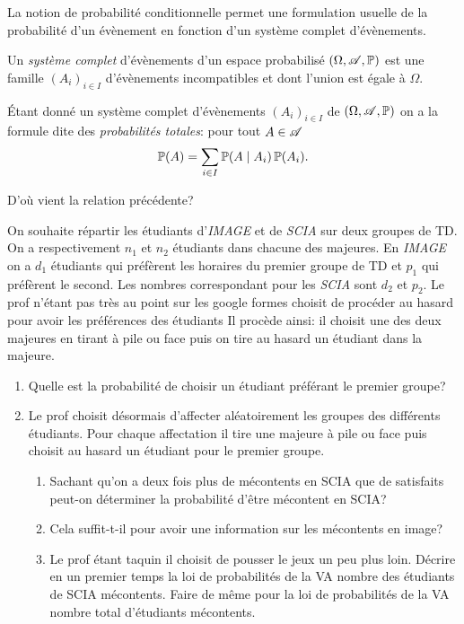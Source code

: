 \documentclass[11pt, a4paper]{article}
\begin{document}
La notion de probabilité conditionnelle permet une formulation usuelle
de la probabilité d'un évènement en fonction d'un système complet
d'évènements.
\begin{defn}
  Un \emph{système complet} d'évènements d'un espace probabilisé
  $(\Omega, \mathscr{A}, \operatorname{\mathbb{P}})$ est une famille $(A_i)_{i \in I}$
  d'évènements incompatibles et dont l'union est égale à
  $\Omega$.
\end{defn}
\begin{prop}
  Étant donné un système complet d'évènements $(A_i)_{i \in I}$ de
  $(\Omega, \mathscr{A}, \operatorname{\mathbb{P}})$ on a la formule dite des \emph{probabilités
    totales}: pour tout $A \in \mathscr{A}$
  \[
    \operatorname{\mathbb{P}}(A) = \sum_{i \in I} \operatorname{\mathbb{P}}(A \mid A_i)\operatorname{\mathbb{P}}(A_i).
  \]
\end{prop}
\begin{question}
  D'où vient la relation précédente?
\end{question}
\begin{question}
  \label{q:repartitionTD}
  On souhaite répartir les étudiants d'\textit{IMAGE} et de
  \textit{SCIA} sur deux groupes de TD. On a respectivement $n_1$ et
  $n_2$ étudiants dans chacune des majeures. En \textit{IMAGE} on a
  $d_1$ étudiants qui préfèrent les horaires du premier groupe de TD
  et $p_1$ qui préfèrent le second. Les nombres correspondant pour les
  \textit{SCIA} sont $d_2$ et $p_2$. Le prof n'étant pas très au point
  sur les google formes choisit de procéder au hasard pour avoir les
  préférences des étudiants Il procède ainsi: il choisit une des deux
  majeures en tirant à pile ou face puis on tire au hasard un étudiant
  dans la majeure.
  \begin{enumerate}
  \item Quelle est la probabilité de choisir un étudiant préférant le
    premier groupe?
  \item Le prof choisit désormais d'affecter aléatoirement les groupes
    des différents étudiants. Pour chaque affectation il tire une
    majeure à pile ou face puis choisit au hasard un étudiant pour le
    premier groupe.
    \begin{enumerate}
    \item Sachant qu'on a deux fois plus de mécontents en SCIA que de
      satisfaits peut-on déterminer la probabilité d'être mécontent en
      SCIA?
    \item Cela suffit-t-il pour avoir une information sur les mécontents
      en image?
    \item Le prof étant taquin il choisit de pousser le jeux un peu
      plus loin. Décrire en un premier temps la loi de probabilités de
      la VA nombre des étudiants de SCIA mécontents. Faire de même
      pour la loi de probabilités de la VA nombre total d'étudiants
      mécontents.
    \end{enumerate}
  \end{enumerate}
\end{question}
\end{document}
